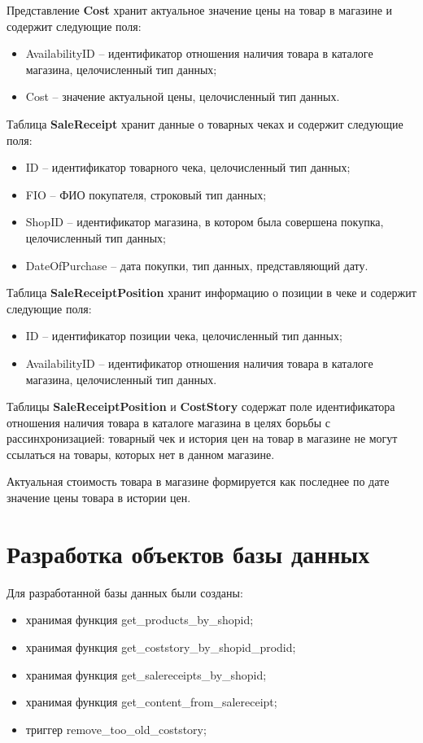 \documentclass{bmstu}
\begin{document}
Представление \textbf{Cost} хранит актуальное значение цены на товар в магазине и содержит следующие поля:
\begin{itemize}
	\item AvailabilityID -- идентификатор отношения наличия товара в каталоге магазина, целочисленный тип данных;
	\item Cost -- значение актуальной цены, целочисленный тип данных.
\end{itemize}


Таблица \textbf{SaleReceipt} хранит данные о товарных чеках и содержит следующие поля:
\begin{itemize}
	\setlength\itemsep{0.01em}
	\item ID -- идентификатор товарного чека, целочисленный тип данных;
	\item FIO -- ФИО покупателя, строковый тип данных;
	\item ShopID -- идентификатор магазина, в котором была совершена покупка, целочисленный тип данных;
	\item DateOfPurchase -- дата покупки, тип данных, представляющий дату.
\end{itemize}


Таблица \textbf{SaleReceiptPosition} хранит информацию о позиции в чеке и содержит следующие поля:
\begin{itemize}
	\setlength\itemsep{0.01em}
	\item ID -- идентификатор позиции чека, целочисленный тип данных;
	\item AvailabilityID -- идентификатор отношения наличия товара в каталоге магазина, целочисленный тип данных.
\end{itemize}


Таблицы \textbf{SaleReceiptPosition} и \textbf{CostStory} содержат поле идентификатора отношения наличия товара в каталоге магазина в целях борьбы с рассинхронизацией: товарный чек и история цен на товар в магазине не могут ссылаться на товары, которых нет в данном магазине.

Актуальная стоимость товара в магазине формируется как последнее по дате значение цены товара в истории цен.

\section{Разработка объектов базы данных}

Для разработанной базы данных были созданы:

\begin{itemize}
	\item хранимая функция get\_products\_by\_shopid;
	\item хранимая функция get\_coststory\_by\_shopid\_prodid;
	\item хранимая функция get\_salereceipts\_by\_shopid;
	\item хранимая функция get\_content\_from\_salereceipt;
	\item триггер remove\_too\_old\_coststory;
\end{itemize}
\end{document}
